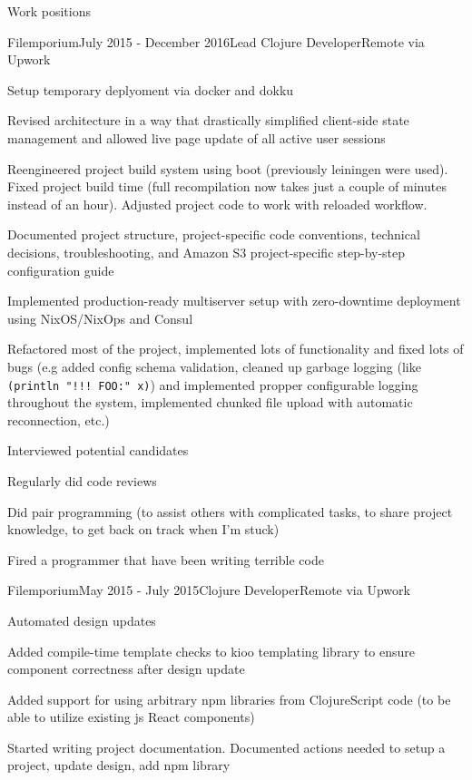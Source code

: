 \documentclass{resume} %
\begin{document}
\begin{rSection}{Work positions}
\begin{rSubsection}{Filemporium}{July 2015 - December 2016}{Lead Clojure Developer}{Remote via Upwork}
\item Setup temporary deplyoment via docker and dokku
\item Revised architecture in a way that drastically simplified client-side
  state management and allowed live page update of all active user sessions
\item Reengineered project build system using boot (previously leiningen were used).
  Fixed project build time (full recompilation now takes just a couple of minutes
  instead of an hour). Adjusted project code to work with reloaded workflow.
\item Documented project structure, project-specific code conventions, technical decisions, troubleshooting, and Amazon S3 project-specific step-by-step configuration guide
\item Implemented production-ready multiserver setup with zero-downtime deployment using NixOS/NixOps and Consul
\item Refactored most of the project, implemented lots of functionality and fixed lots of bugs (e.g added
  config schema validation, cleaned up garbage logging (like {\tt (println "!!! FOO:" x)}) and implemented
  propper configurable logging throughout the system, implemented chunked file upload with automatic reconnection, etc.)
\item Interviewed potential candidates
\item Regularly did code reviews
\item Did pair programming (to assist others with complicated tasks, to share project knowledge, to get
  back on track when I'm stuck)
\item Fired a programmer that have been writing terrible code
\end{rSubsection}

\begin{rSubsection}{Filemporium}{May 2015 - July 2015}{Clojure Developer}{Remote via Upwork}
\item Automated design updates
\item Added compile-time template checks to kioo templating library to ensure
  component correctness after design update
\item Added support for using arbitrary npm libraries from ClojureScript code (to be
  able to utilize existing js React components)
\item Started writing project documentation. Documented actions needed to setup
  a project, update design, add npm library


\end{rSubsection}
\end{rSection}
\end{document}
